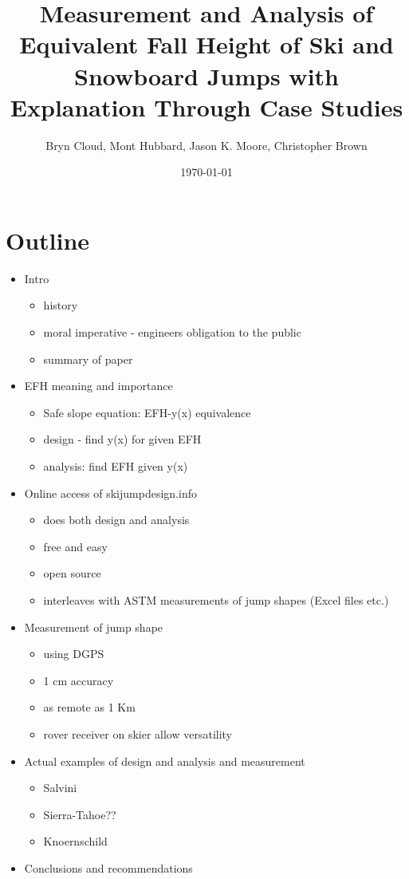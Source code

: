 \documentclass{article}
\title{Measurement and Analysis of Equivalent Fall Height of Ski and Snowboard Jumps with Explanation Through Case Studies}
\author{Bryn Cloud, Mont Hubbard, Jason K. Moore, Christopher Brown}
\date{\today}
\begin{document}
\maketitle

\section*{Outline}
%
\begin{itemize}
  \item Intro
  \begin{itemize}
    \item history
    \item moral imperative - engineers obligation to the public
    \item summary of paper
  \end{itemize}
  \item EFH meaning and importance
  \begin{itemize}
    \item Safe slope equation: EFH-y(x) equivalence
    \item design - find y(x) for given EFH
    \item analysis: find EFH given y(x)
  \end{itemize}
  \item Online access of skijumpdesign.info
  \begin{itemize}
    \item does both design and analysis
    \item free and easy
    \item open source
    \item interleaves with ASTM measurements of jump shapes (Excel files etc.)
  \end{itemize}
  \item Measurement of jump shape
  \begin{itemize}
    \item using DGPS
    \item 1 cm accuracy
    \item as remote as 1 Km
    \item rover receiver on skier allow versatility
  \end{itemize}
  \item Actual examples of design and analysis and measurement
  \begin{itemize}
    \item Salvini
    \item Sierra-Tahoe??
    \item Knoernschild
  \end{itemize}
  \item Conclusions and recommendations
\end{itemize}
\end{document}

